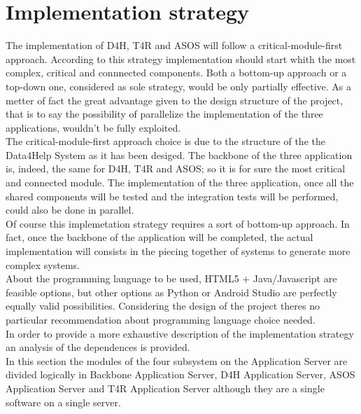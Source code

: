 
\section{Implementation strategy }

The implementation of D4H, T4R and ASOS will follow a critical-module-first approach. According to this strategy implementation should start whith the most complex, critical and connnected components. Both a bottom-up approach or a top-down one, considered as sole strategy, would be only partially effective. As a metter of fact the great advantage given to the design structure of the project, that is to say the possibility of parallelize the implementation of the three applications, wouldn't be fully exploited.\\ The critical-module-first approach choice is due to the structure of the the Data4Help System as it has been desiged. The backbone of the three application is, indeed, the same for D4H, T4R and ASOS; so it is for sure the most critical and connected module. The implementation of the three application, once all the shared components will be tested and the integration tests will be performed, could also be done in parallel. \\ Of course this implemetation strategy requires a sort of bottom-up approach. In fact, once the backbone of the application will be completed, the actual implementation will consists in the piecing together of systems to generate more complex systems. \\ About the programming language to be used, HTML5 + Java/Javascript are feasible options, but other options as Python or Android Studio are perfectly equally valid possibilities. Considering the design of the project theres no particular recommendation about programming language choice needed. \\ In order to provide a more exhaustive description of the implementation strategy an analysis of the dependences is provided. \\
In this section the modules of the four subsystem on the Application Server are divided logically in Backbone Application Server, D4H Application Server, ASOS Application Server and T4R Application Server although they are a single software on a single server.

